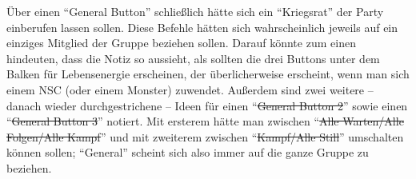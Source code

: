 \documentclass[a5paper,pagesize]{scrbook}
\begin{document}
Über einen \enquote{General Button} schließlich hätte sich ein \enquote{Kriegsrat} der Party einberufen lassen sollen.
Diese Befehle hätten sich wahrscheinlich jeweils auf ein einziges Mitglied der Gruppe beziehen sollen.
Darauf könnte zum einen hindeuten, dass die Notiz so aussieht, als sollten die drei Buttons unter dem Balken für Lebensenergie erscheinen, der überlicherweise erscheint, wenn man sich einem NSC (oder einem Monster) zuwendet.
Außerdem sind zwei weitere -- danach wieder durchgestrichene -- Ideen für einen \enquote{\sout{General Button 2}} sowie einen \enquote{\sout{General Button 3}} notiert.
Mit ersterem hätte man zwischen \enquote{\sout{Alle Warten/Alle Folgen/Alle Kampf}} und mit zweiterem zwischen \enquote{\sout{Kampf/Alle Still}} umschalten können sollen;\autocite[S.~5]{orpheus_interface} \enquote{General} scheint sich also immer auf die ganze Gruppe zu beziehen.
\end{document}
